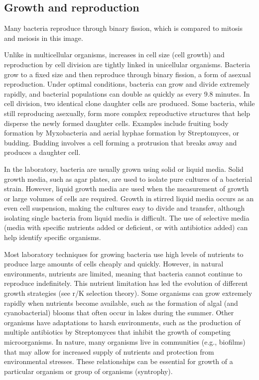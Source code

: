 \hypertarget{growth-and-reproduction}{%
\subsection{Growth and reproduction}\label{growth-and-reproduction}}

Many bacteria reproduce through binary fission, which is compared to mitosis and meiosis in this image.

Unlike in multicellular organisms, increases in cell size (cell growth) and reproduction by cell division are tightly linked in unicellular organisms. Bacteria grow to a fixed size and then reproduce through binary fission, a form of asexual reproduction. Under optimal conditions, bacteria can grow and divide extremely rapidly, and bacterial populations can double as quickly as every 9.8 minutes. In cell division, two identical clone daughter cells are produced. Some bacteria, while still reproducing asexually, form more complex reproductive structures that help disperse the newly formed daughter cells. Examples include fruiting body formation by Myxobacteria and aerial hyphae formation by Streptomyces, or budding. Budding involves a cell forming a protrusion that breaks away and produces a daughter cell.

In the laboratory, bacteria are usually grown using solid or liquid media. Solid growth media, such as agar plates, are used to isolate pure cultures of a bacterial strain. However, liquid growth media are used when the measurement of growth or large volumes of cells are required. Growth in stirred liquid media occurs as an even cell suspension, making the cultures easy to divide and transfer, although isolating single bacteria from liquid media is difficult. The use of selective media (media with specific nutrients added or deficient, or with antibiotics added) can help identify specific organisms.

Most laboratory techniques for growing bacteria use high levels of nutrients to produce large amounts of cells cheaply and quickly. However, in natural environments, nutrients are limited, meaning that bacteria cannot continue to reproduce indefinitely. This nutrient limitation has led the evolution of different growth strategies (see r/K selection theory). Some organisms can grow extremely rapidly when nutrients become available, such as the formation of algal (and cyanobacterial) blooms that often occur in lakes during the summer. Other organisms have adaptations to harsh environments, such as the production of multiple antibiotics by Streptomyces that inhibit the growth of competing microorganisms. In nature, many organisms live in communities (e.g., biofilms) that may allow for increased supply of nutrients and protection from environmental stresses. These relationships can be essential for growth of a particular organism or group of organisms (syntrophy).

